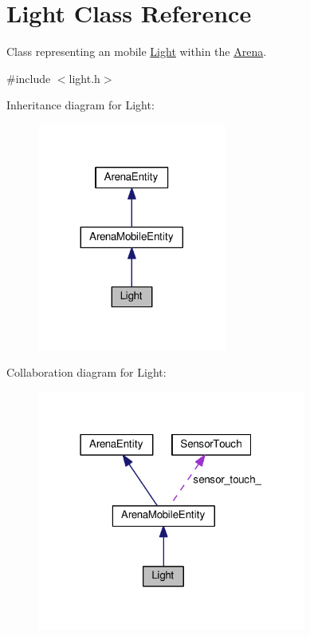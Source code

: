 \hypertarget{classLight}{}\section{Light Class Reference}
\label{classLight}


Class representing an mobile \hyperlink{classLight}{Light} within the \hyperlink{classArena}{Arena}.  




{\ttfamily \#include $<$light.\+h$>$}



Inheritance diagram for Light\+:\nopagebreak
\begin{figure}[H]
\begin{center}
\leavevmode
\includegraphics[width=176pt]{classLight__inherit__graph}
\end{center}
\end{figure}


Collaboration diagram for Light\+:\nopagebreak
\begin{figure}[H]
\begin{center}
\leavevmode
\includegraphics[width=250pt]{classLight__coll__graph}
\end{center}
\end{figure}
